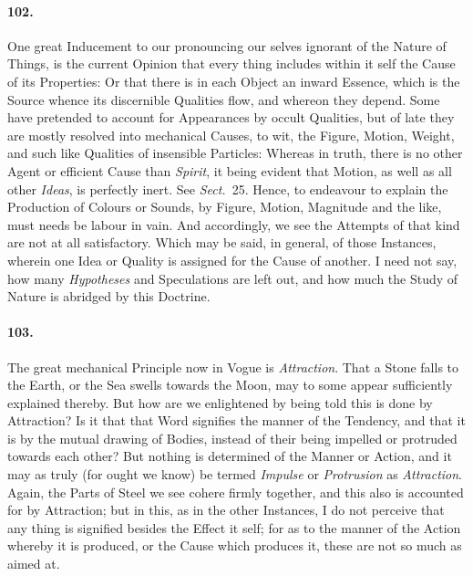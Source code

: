 \documentclass[]{article}
\newenvironment{sectionbody}{}{}
\begin{document}
\begin{sectionbody}
\paragraph{102.} One great Inducement to our pronouncing our selves ignorant of
the Nature of Things, is the current Opinion that every thing
includes within it self the Cause of its Properties: Or that
there is in each Object an inward Essence, which is the Source
whence its discernible Qualities flow, and whereon they depend.
Some have pretended to account for Appearances by occult
Qualities, but of late they are mostly resolved into mechanical
Causes, to wit, the Figure, Motion, Weight, and such like
Qualities of insensible Particles: Whereas in truth, there is no
other Agent or efficient Cause than \emph{Spirit}, it being
evident that Motion, as well as all other \emph{Ideas}, is
perfectly inert.  See \emph{Sect.}~25.
Hence, to endeavour to explain the Production of Colours or
Sounds, by Figure, Motion, Magnitude and the like, must needs be
labour in vain.  And accordingly, we see the Attempts of that
kind are not at all satisfactory.  Which may be said, in general,
of those Instances, wherein one Idea or Quality is assigned for
the Cause of another.  I need not say, how many
\emph{Hypotheses} and Speculations are left out, and how much
the Study of Nature is abridged by this Doctrine.



\paragraph{103.} The great mechanical Principle now in Vogue is
\emph{Attraction}.  That a Stone falls to the Earth, or the Sea
swells towards the Moon, may to some appear sufficiently
explained thereby.  But how are we enlightened by being told this
is done by Attraction? Is it that that Word signifies the manner
of the Tendency, and that it is by the mutual drawing of Bodies,
instead of their being impelled or protruded towards each other?
But nothing is determined of the Manner or Action, and it may as
truly (for ought we know) be termed \emph{Impulse} or
\emph{Protrusion} as \emph{Attraction}.  Again, the Parts of
Steel we see cohere firmly together, and this also is accounted
for by Attraction; but in this, as in the other Instances, I do
not perceive that any thing is signified besides the Effect it
self; for as to the manner of the Action whereby it is produced,
or the Cause which produces it, these are not so much as aimed
at.




\end{sectionbody}
\end{document}
